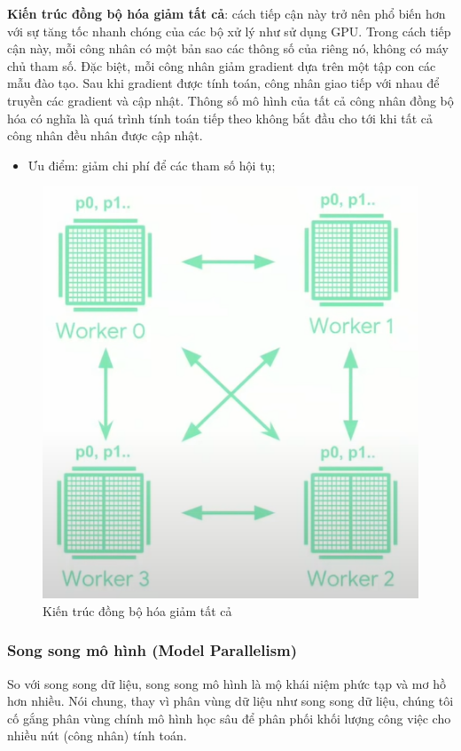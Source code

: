 \documentclass[11pt,a4paper]{article}
\numberwithin{equation}{subsection}
\numberwithin{figure}{subsection}
\numberwithin{table}{subsection}
\begin{document}
\textbf{Kiến trúc đồng bộ hóa giảm tất cả}: cách tiếp cận này trở nên phổ biến hơn với sự tăng tốc nhanh chóng của các bộ xử lý như sử dụng GPU. Trong cách tiếp cận này, mỗi công nhân có một bản sao các thông số của riêng nó, không có máy chủ tham số. Đặc biệt, mỗi công nhân giảm gradient dựa trên một tập con các mẫu đào tạo. Sau khi gradient được tính toán, công nhân giao tiếp với nhau để truyền các gradient và cập nhật. Thông số mô hình của tất cả công nhân đồng bộ hóa có nghĩa là quá trình tính toán tiếp theo không bắt đầu cho tới khi tất cả công nhân đều nhân được cập nhật.
\begin{itemize}
	\item Ưu điểm: giảm chi phí để các tham số hội tụ;
\end{itemize}
\begin{figure}[!h]
\begin{center}
\includegraphics[scale=0.7]{sync.PNG}
\end{center}
\caption{Kiến trúc đồng bộ hóa giảm tất cả}
\end{figure}


\subsubsection{Song song mô hình (Model Parallelism)}
So với song song dữ liệu, song song mô hình là mộ khái niệm phức tạp và mơ hồ hơn nhiều. Nói chung, thay vì phân vùng dữ liệu như song song dữ liệu, chúng tôi cố gắng phân vùng chính mô hình học sâu để phân phối khối lượng công việc cho nhiều nút (công nhân) tính toán.\\
	
\end{document}
